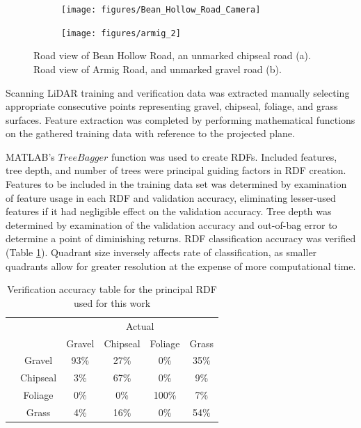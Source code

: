 \documentclass[journal,onecolumn]{IEEEtran}
\begin{document}
{	\begin{figure}[H]
		\centering
		\begin{subfigure}{0.45\textwidth}
			\centering
			\texttt{[image: figures/Bean\_Hollow\_Road\_Camera]}
			\caption[Bean Hollow Road Camera View]{}
			\label{fig:Bean_Cam_View}
		\end{subfigure}
		\begin{subfigure}{0.45\textwidth}
			\centering
			\texttt{[image: figures/armig\_2]}
			\caption[Armig Road Camera View]{}
			\label{fig:Armig_Road_Camera_View}
		\end{subfigure}
		\caption[Armig Road \& Bean Hollow Road]{Road view of Bean Hollow Road, an unmarked chipseal road (a). Road view of Armig Road, and unmarked gravel road (b).}
		\label{fig:Combined_Roads}
	\end{figure}
	
	
	Scanning LiDAR training and verification data was extracted manually selecting appropriate consecutive points representing gravel, chipseal, foliage, and grass surfaces. Feature extraction was completed by performing mathematical functions on the gathered training data with reference to the projected plane.
	
	MATLAB's $TreeBagger$ function was used to create RDFs. Included features, tree depth, and number of trees were principal guiding factors in RDF creation. Features to be included in the training data set was determined by examination of feature usage in each RDF and validation accuracy, eliminating lesser-used features if it had negligible effect on the validation accuracy. Tree depth was determined by examination of the validation accuracy and out-of-bag error to determine a point of diminishing returns. RDF classification accuracy was verified (Table \ref{tab:Verification_Results}). Quadrant size inversely affects rate of classification, as smaller quadrants allow for greater resolution at the expense of more computational time.
	
	\begin{table}
		\centering
		\begin{tabular}{lc|c|c|c|c|}
			\multicolumn{1}{c}{}       & \multicolumn{1}{c}{} & \multicolumn{4}{c}{Actual}                                                                                           \\
			\multicolumn{1}{c}{}       & \multicolumn{1}{c}{} & \multicolumn{1}{c}{Gravel} & \multicolumn{1}{c}{Chipseal} & \multicolumn{1}{c}{Foliage} & \multicolumn{1}{c}{Grass}  \\ 
			\cline{3-6}
			\multirow{4}{*}{\rotatebox[origin=c]{90}{Predicted}} 	& Gravel 	& 93\% 		& 27\% 		& 0\% 		& 35\% \\ 
			\cline{3-6}
			& Chipseal 	& 3\% 		& 67\% 		& 0\% 		& 9\% \\ 
			\cline{3-6}
			& Foliage 	& 0\% 		& 0\% 		& 100\% 	& 7\% \\ 
			\cline{3-6}
			& Grass 	& 4\% 		& 16\% 		& 0\% 		& 54\% \\
			\cline{3-6}
		\end{tabular}
		\caption{Verification accuracy table for the principal RDF used for this work}
		\label{tab:Verification_Results}
	\end{table}
	
}
\end{document}
